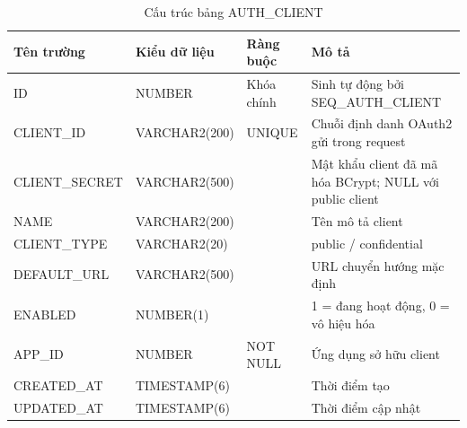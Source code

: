 \documentclass[../DoAn.tex]{subfiles}
\begin{document}
\begin{table}[H]
\centering
\caption{Cấu trúc bảng AUTH\_CLIENT}
\label{tab:auth-client}
\footnotesize
\begin{tabular}{|p{3.0cm}|p{2.3cm}|p{2.7cm}|p{4.5cm}|}
\hline
\textbf{Tên trường} & \textbf{Kiểu dữ liệu} & \textbf{Ràng buộc} & \textbf{Mô tả} \\ \hline
ID & NUMBER & Khóa chính & Sinh tự động bởi SEQ\_AUTH\_CLIENT \\ \hline
CLIENT\_ID & VARCHAR2(200) & UNIQUE & Chuỗi định danh OAuth2 gửi trong request \\ \hline
CLIENT\_SECRET & VARCHAR2(500) & & Mật khẩu client đã mã hóa BCrypt; NULL với public client \\ \hline
NAME & VARCHAR2(200) & & Tên mô tả client \\ \hline
CLIENT\_TYPE & VARCHAR2(20) & & public / confidential \\ \hline
DEFAULT\_URL & VARCHAR2(500) & & URL chuyển hướng mặc định \\ \hline
ENABLED & NUMBER(1) & & 1 = đang hoạt động, 0 = vô hiệu hóa \\ \hline
APP\_ID & NUMBER & NOT NULL & Ứng dụng sở hữu client \\ \hline
CREATED\_AT & TIMESTAMP(6) & & Thời điểm tạo \\ \hline
UPDATED\_AT & TIMESTAMP(6) & & Thời điểm cập nhật \\ \hline
\end{tabular}
\end{table}
\end{document}
